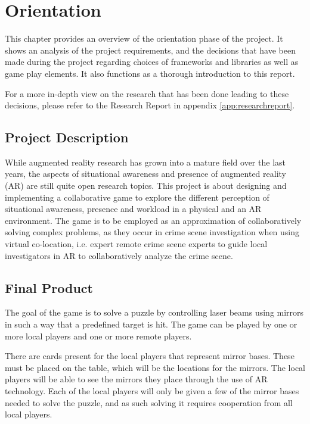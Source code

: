\chapter{Orientation} \label{cha:orientation}
	This chapter provides an overview of the orientation phase of the project.
	It shows an analysis of the project requirements, and the decisions that
	have been made during the project regarding choices of frameworks and
	libraries as well as game play elements. It also functions as a thorough
	introduction to this report.

	For a more in-depth view on the research that has been done leading to
	these decisions, please refer to the Research Report in appendix
	\ref{app:researchreport}.

	\section{Project Description} \label{sec:projectdescription}
		While augmented reality research has grown into a mature field over the
		last years, the aspects of situational awareness and presence of
		augmented reality (AR) are still quite open research topics. This
		project is about designing and implementing a collaborative game to
		explore the different perception of situational awareness, presence and
		workload in a physical and an AR environment. The game is to be employed
		as an approximation of collaboratively solving complex problems, as they
		occur in crime scene investigation when using virtual co-location, i.e.
		expert remote crime scene experts to guide local investigators in
		AR to collaboratively analyze the crime scene.

	\section{Final Product} \label{sec:finalproduct}
		The goal of the game is to solve a puzzle by controlling laser beams
		using mirrors in such a way that a predefined target is hit. The game
		can be played by one or more local players and one or more remote players.
		
		There are cards present for the local players that represent mirror
		bases. These must be placed on the table, which will be the locations
		for the mirrors. The local players will be able to see the mirrors they
		place through the use of AR technology. Each of the local players will
		only be given a few of the mirror bases needed to solve the puzzle, and
		as such solving it requires cooperation from all local players.
		
